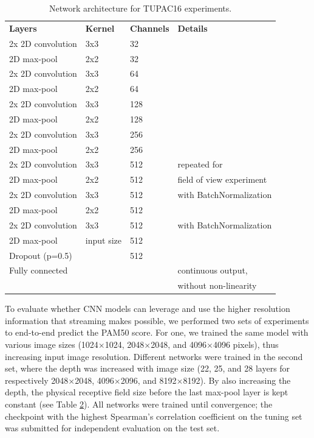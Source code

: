\documentclass[
  12pt,
  a5,margin=2cmpaper,
]{article}
\begin{document}
\hypertarget{tab:extset}{}
\begin{longtable}[]{@{}llll@{}}
\caption{Network architecture for TUPAC16 experiments.}\tabularnewline
\toprule\noalign{}
\endfirsthead
\endhead
\bottomrule\noalign{}
\endlastfoot
\textbf{Layers} & \textbf{Kernel} & \textbf{Channels} &
\textbf{Details} \\
2x 2D convolution & 3x3 & 32 & \\
2D max-pool & 2x2 & 32 & \\
2x 2D convolution & 3x3 & 64 & \\
2D max-pool & 2x2 & 64 & \\
2x 2D convolution & 3x3 & 128 & \\
2D max-pool & 2x2 & 128 & \\
2x 2D convolution & 3x3 & 256 & \\
2D max-pool & 2x2 & 256 & \\
2x 2D convolution & 3x3 & 512 & repeated for \\
2D max-pool & 2x2 & 512 & field of view experiment \\
2x 2D convolution & 3x3 & 512 & with BatchNormalization \\
2D max-pool & 2x2 & 512 & \\
2x 2D convolution & 3x3 & 512 & with BatchNormalization \\
2D max-pool & input size & 512 & \\
Dropout (p=0.5) & & 512 & \\
Fully connected & & & continuous output, \\
& & & without non-linearity \\
\end{longtable}

To evaluate whether CNN models can leverage and use the higher
resolution information that streaming makes possible, we performed two
sets of experiments to end-to-end predict the PAM50 score. For one, we
trained the same model with various image sizes (1024\(\times\)1024,
2048\(\times\)2048, and 4096\(\times\)4096 pixels), thus increasing
input image resolution. Different networks were trained in the second
set, where the depth was increased with image size (22, 25, and 28
layers for respectively 2048\(\times\)2048, 4096\(\times\)2096, and
8192\(\times\)8192). By also increasing the depth, the physical
receptive field size before the last max-pool layer is kept constant
(see Table \protect\hyperlink{tab:extset}{2}). All networks were trained
until convergence; the checkpoint with the highest Spearman's
correlation coefficient on the tuning set was submitted for independent
evaluation on the test set.
\end{document}
